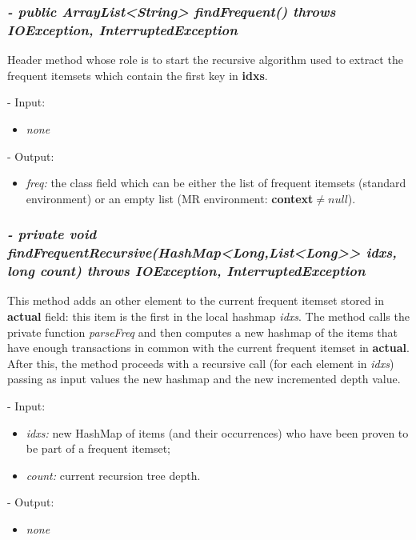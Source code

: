 \documentclass[]{report}
\begin{document}
	\subsubsection*{\textit{\textbf{-} public ArrayList<String> findFrequent() throws IOException, InterruptedException}}   	
	Header method whose role is to start the recursive algorithm used to extract the frequent itemsets which contain the first key in \textbf{idxs}.    
	\begin{description}
		\item - Input:
		\begin{itemize}
			\item \textit{none}
		\end{itemize}
	\end{description}	
	\begin{description}
		\item - Output:
		\begin{itemize}
			\item \textit{freq:} the class field which can be either the list of frequent itemsets (standard environment) or an empty list (MR environment: \textbf{context}$\neq$$null$). 
		\end{itemize}
	\end{description}
	
	\subsubsection*{\textit{\textbf{-} private void findFrequentRecursive(HashMap<Long,List<Long>> idxs, long count) throws IOException, InterruptedException}}   	
	This method adds an other element to the current frequent itemset stored in \textbf{actual} field: this item is the first in the local hashmap \textit{idxs}. The method calls the private function \textit{parseFreq} and then computes a new hashmap of the items that have enough transactions in common with the current frequent itemset in \textbf{actual}. After this, the method proceeds with a recursive call (for each element in \textit{idxs}) passing as input values the new hashmap and the new incremented depth value.   
	  
	\begin{description}
		\item - Input:
		\begin{itemize}
			\item \textit{idxs:} new HashMap of items (and their occurrences) who have been proven to be part of a frequent itemset;
			\item \textit{count:} current recursion tree depth.
		\end{itemize}
	\end{description}	
	\begin{description}
		\item - Output:
		\begin{itemize}
			\item \textit{none} 
		\end{itemize}
	\end{description}
	
\end{document}
